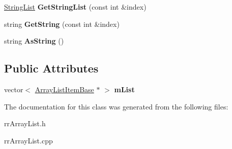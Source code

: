 \begin{DoxyCompactItemize}
\item 
\hypertarget{classrrc_1_1_array_list_a4e6b989d0f9331633c3f65ffcbcfd6be}{}\hyperlink{classrrc_1_1_string_list}{String\+List} {\bfseries Get\+String\+List} (const int \&index)\label{classrrc_1_1_array_list_a4e6b989d0f9331633c3f65ffcbcfd6be}

\item 
\hypertarget{classrrc_1_1_array_list_aaa7f02195ec53275ec1c373805c843df}{}string {\bfseries Get\+String} (const int \&index)\label{classrrc_1_1_array_list_aaa7f02195ec53275ec1c373805c843df}

\item 
\hypertarget{classrrc_1_1_array_list_ac7228c093577178c2fbaab601cdd4ed5}{}string {\bfseries As\+String} ()\label{classrrc_1_1_array_list_ac7228c093577178c2fbaab601cdd4ed5}

\end{DoxyCompactItemize}
\subsection*{Public Attributes}
\begin{DoxyCompactItemize}
\item 
\hypertarget{classrrc_1_1_array_list_a95f2675e5a863b48343d2e6103eb53b5}{}vector$<$ \hyperlink{classrrc_1_1_array_list_item_base}{Array\+List\+Item\+Base} $\ast$ $>$ {\bfseries m\+List}\label{classrrc_1_1_array_list_a95f2675e5a863b48343d2e6103eb53b5}

\end{DoxyCompactItemize}


The documentation for this class was generated from the following files\+:\begin{DoxyCompactItemize}
\item 
rr\+Array\+List.\+h\item 
rr\+Array\+List.\+cpp\end{DoxyCompactItemize}
